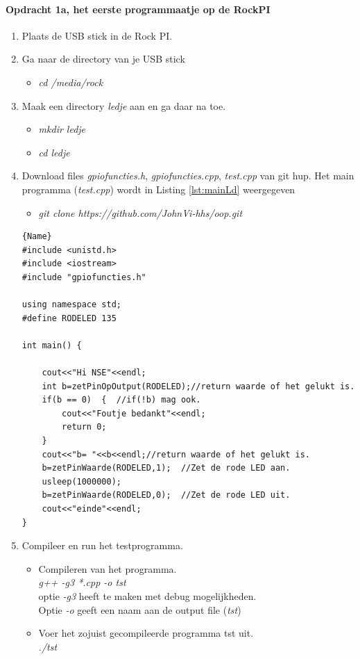 \paragraph[Opdracht 1a]{Opdracht 1a, het eerste programmaatje op de RockPI}	

\begin{enumerate}
	\item Plaats de USB stick in de Rock PI.
	\item Ga naar de directory van je USB stick
	\begin{itemize}
		\item \textit{cd /media/rock}
	\end{itemize}
    
    \item Maak een directory \textit{ledje} aan en ga daar na toe.
	\begin{itemize}
	    \item \textit{mkdir ledje}
	    \item \textit{cd ledje}
    \end{itemize}  
   \item Download files \textit{gpiofuncties.h}, \textit{gpiofuncties.cpp}, \textit{test.cpp} van git hup. Het main programma (\textit{test.cpp}) wordt in Listing \ref{lst:mainLd} weergegeven
   	\begin{itemize}
     	\item \textit{git clone https://github.com/JohnVi-hhs/oop.git}
     	
     
  	
   \end{itemize}

\begin{lstlisting}[caption=Zet LED aan en uit,frame=tlrb,label={lst:mainLd}]{Name}
#include <unistd.h>
#include <iostream>
#include "gpiofuncties.h"
	
using namespace std;
#define RODELED 135
	
int main() {
		
	cout<<"Hi NSE"<<endl;
	int b=zetPinOpOutput(RODELED);//return waarde of het gelukt is.
	if(b == 0)  {  //if(!b) mag ook. 
		cout<<"Foutje bedankt"<<endl;
		return 0;
	}
	cout<<"b= "<<b<<endl;//return waarde of het gelukt is.
	b=zetPinWaarde(RODELED,1);  //Zet de rode LED aan.
	usleep(1000000);
	b=zetPinWaarde(RODELED,0);  //Zet de rode LED uit.
	cout<<"einde"<<endl;
}
\end{lstlisting}
   \item Compileer en run het testprogramma.
\begin{itemize}
	\item Compileren van het programma. \\\textit{g++ -g3 *.cpp -o tst}\\
	optie \textit{-g3} heeft te maken met debug mogelijkheden. \\
	Optie \textit{-o} geeft een naam aan de output file (\textit{tst})
	\item Voer het zojuist gecompileerde programma tst uit.\\\textit{./tst}  
	

\end{itemize}
\end{enumerate}
